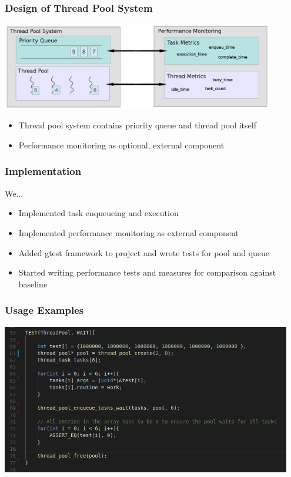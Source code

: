 \documentclass{beamer}
\begin{document}
\begin{frame}
	\frametitle{Design of Thread Pool System}
	\begin{center}
		\includegraphics[width=0.9\textwidth]{img/pool_structure.png}
	\end{center}
	\begin{itemize}
		\item Thread pool system contains priority queue and thread pool itself
		\item Performance monitoring as optional, external component
	\end{itemize}
\end{frame}

\begin{frame}
	\frametitle{Implementation}
	We...
	\begin{itemize}
		\item Implemented task enqueueing and execution
		\item Implemented performance monitoring as external component
		\item Added gtest framework to project and wrote tests for pool and queue
		\item Started writing performance tests and measures for comparison against baseline
	\end{itemize}
\end{frame}

\begin{frame}
	\frametitle{Usage Examples}
	\begin{center}
		\includegraphics[width=0.95\textwidth]{img/thread_pool_use.png}
	\end{center}
\end{frame}
\end{document}
